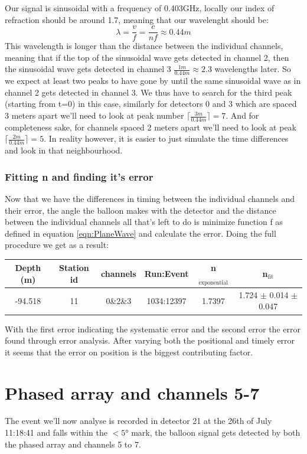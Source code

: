 Our signal is sinusoidal with a frequency of 0.403GHz, locally our index of refraction should be around 1.7,
meaning that our wavelenght should be:
\begin{equation}
  \lambda = \frac{v}{f} = \frac{c}{nf} \approx 0.44m
\end{equation}
This wavelength is longer than the distance between the individual channels, meaning that if the top
of the sinusoidal wave gets detected in channel 2, then the sinusoidal wave gets detected in
channel 3 $\frac{1m}{0.44m} \approx 2.3$ wavelengths later. So we expect at least two peaks to 
have gone by until the same sinusoidal wave as in channel 2 gets detected in channel 3.
We thus have to search for the third peak (starting from t=0) in this case, similarly for detectors 0 and 3
which are spaced 3 meters apart we'll need to look at peak number $\lceil\frac{3m}{0.44m}\rceil = 7$.
And for completeness sake, for channels spaced 2 meters apart we'll need to look at peak 
$\lceil\frac{2m}{0.44m}\rceil = 5$. In reality however, it is easier to just simulate the time differences
and look in that neighbourhood.

\subsubsection{Fitting n and finding it's error}
Now that we have the differences in timing between the individual channels and their error, the
angle the balloon makes with the detector and the distance between the individual channels
all that's left to do is minimize function f as defined in equation \ref{eqn:PlaneWave} and
calculate the error. Doing the full procedure we get as a result:
\begin{center}
\begin{tabular}{||c c c c c c||}
 \hline
 Depth (m) & Station id & channels & Run:Event & n$_\text{exponential}$ & n$_\text{fit}$\\ [0.5ex]
 \hline\hline
 -94.518 & 11 & 0\&2\&3 & 1034:12397 & 1.7397 & 1.724 $\pm$ 0.014 $\pm$ 0.047 \\
 \hline
\end{tabular}
\end{center}
With the first error indicating the systematic error and the second error the error found through
error analysis. After varying both the positional and timely error it seems that the error on position is the biggest
contributing factor.

\section{Phased array and channels 5-7}
The event we'll now analyse is recorded in detector 21 at the 26th of July
11:18:41 and falls within the $<5$° mark, the balloon signal gets detected
by both the phased array and channels 5 to 7.

